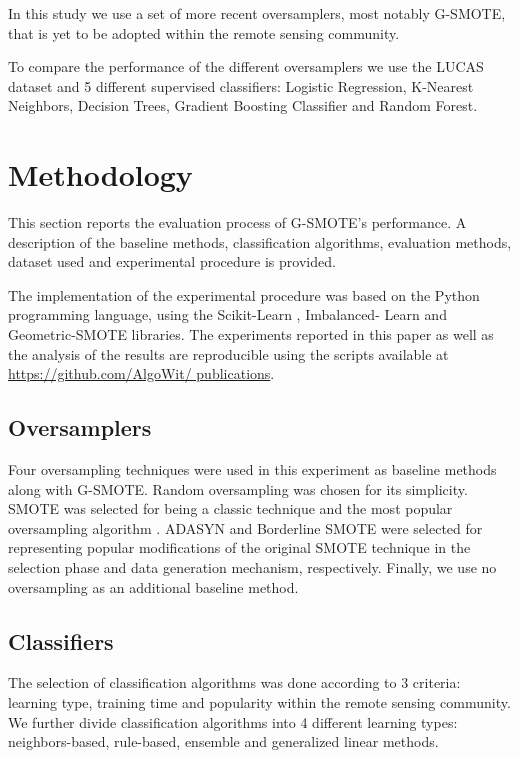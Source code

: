\documentclass[parskip=full]{scrartcl}
\begin{document}
In this study we use a set of
more recent oversamplers, most notably G-SMOTE, that is yet to be adopted within
the remote sensing community.

To compare the performance of the different oversamplers we use the LUCAS
dataset and 5 different supervised classifiers: Logistic Regression, K-Nearest
Neighbors, Decision Trees, Gradient Boosting Classifier and Random Forest.

\section{Methodology}

This section reports the evaluation process of G-SMOTE's performance. A
description of the baseline methods, classification algorithms, evaluation
methods, dataset used and experimental procedure is provided.

The implementation of the experimental procedure was based on the Python
programming language, using the Scikit-Learn \cite{Pedregosa2011}, Imbalanced-
Learn \cite{JMLR:v18:16-365} and Geometric-SMOTE \cite{Douzas2019} libraries.
The experiments reported in this paper as well as the analysis of the results
are reproducible using the scripts available at \url{https://github.com/AlgoWit/
publications}.

\subsection{Oversamplers}

Four oversampling techniques were used in this experiment as baseline methods
along with G-SMOTE. Random oversampling was chosen for its simplicity. SMOTE was
selected for being a classic technique and the most popular oversampling
algorithm \cite{Douzas2019}. ADASYN \cite{HaiboHe2008} and Borderline SMOTE
\cite{Han2005} were selected for representing popular modifications of the
original SMOTE technique in the selection phase and data generation mechanism,
respectively. Finally, we use no oversampling as an additional baseline method.

\subsection{Classifiers}

The selection of classification algorithms was done according to 3 criteria:
learning type, training time and popularity within the remote sensing community.
We further divide classification algorithms into 4 different learning types:
neighbors-based, rule-based, ensemble and generalized linear methods.
\end{document}
